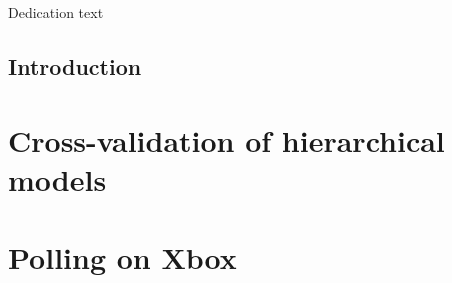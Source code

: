 \documentclass[12pt,openright,oneside,letterpaper,onecolumn]{report}  %
\begin{document}
\pagestyle{empty}

\thesistitlepage
\thesiscopyrightpage

\thesisabstract


\pagestyle{plain}

\setlength{\footskip}{0.5in}

\setcounter{tocdepth}{2}
\renewcommand{\contentsname}{Table of Contents}
\tableofcontents
\cleardoublepage

\listoffigures
\cleardoublepage

\listoftables 
\cleardoublepage


\cleardoublepage

\thispagestyle{plain}
\strut \vfill
\centerline{\LARGE 
Dedication text
}
\vfill \strut
\cleardoublepage


\pagestyle{headings}

%
%
\setlength{\textheight}{8.5in}
\setlength{\footskip}{0in}

 {%
\fancyhf{}
\fancyhead[LE,RO]{\thepage}
\fancyhead[RE,LO]{\itshape \leftmark}
\renewcommand{\headrulewidth}{0pt}
}
\pagestyle{plain}

\chapter{Introduction}
\label{section:intro}


\part{Cross-validation of hierarchical models}
\label{sec:xval}


\part{Polling on Xbox}
\label{sec:xbox}

\end{document}
